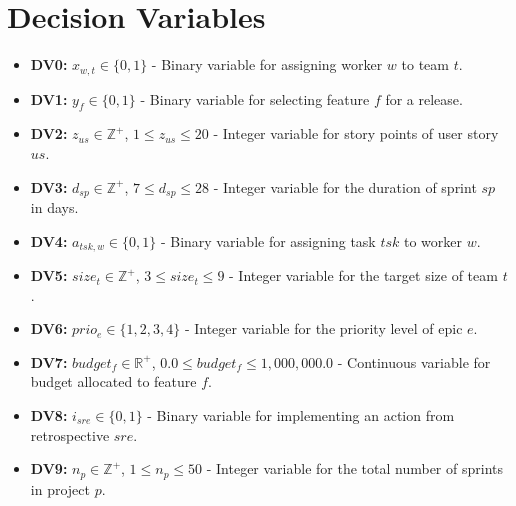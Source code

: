 \documentclass[11pt]{article}
\begin{document}
\section{Decision Variables}
\begin{itemize}
    \item \textbf{DV0:} $x_{w,t} \in \{0, 1\}$ - Binary variable for assigning worker $w$ to team $t$.
    \item \textbf{DV1:} $y_f \in \{0, 1\}$ - Binary variable for selecting feature $f$ for a release.
    \item \textbf{DV2:} $z_{us} \in \mathbb{Z}^+$, $1 \leq z_{us} \leq 20$ - Integer variable for story points of user story $us$.
    \item \textbf{DV3:} $d_{sp} \in \mathbb{Z}^+$, $7 \leq d_{sp} \leq 28$ - Integer variable for the duration of sprint $sp$ in days.
    \item \textbf{DV4:} $a_{tsk, w} \in \{0, 1\}$ - Binary variable for assigning task $tsk$ to worker $w$.
    \item \textbf{DV5:} $size_t \in \mathbb{Z}^+$, $3 \leq size_t \leq 9$ - Integer variable for the target size of team $t$.
    \item \textbf{DV6:} $prio_e \in \{1, 2, 3, 4\}$ - Integer variable for the priority level of epic $e$.
    \item \textbf{DV7:} $budget_f \in \mathbb{R}^+$, $0.0 \leq budget_f \leq 1,\!000,\!000.0$ - Continuous variable for budget allocated to feature $f$.
    \item \textbf{DV8:} $i_{sre} \in \{0, 1\}$ - Binary variable for implementing an action from retrospective $sre$.
    \item \textbf{DV9:} $n_{p} \in \mathbb{Z}^+$, $1 \leq n_{p} \leq 50$ - Integer variable for the total number of sprints in project $p$.
\end{itemize}
\end{document}
